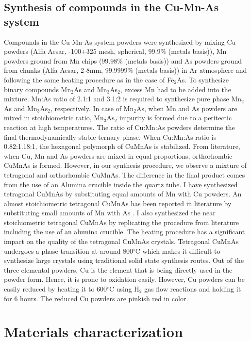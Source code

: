 \documentclass[10pt,doublespacing,edeposit]{uiucthesis2020}
\begin{document}
\begin{mainmatter}
\subsection{Synthesis of compounds in the Cu-Mn-As system}


Compounds in the Cu-Mn-As system powders were synthesized by mixing Cu powders (Alfa Aesar, -100+325 mesh, spherical, 99.9\% (metals basis)), Mn powders ground from Mn chips (99.98\% (metals basis)) and As powders ground from chunks (Alfa Aesar, 2-8mm, 99.9999\% (metals basis)) in Ar atmosphere and following the same heating procedure as in the case of Fe$_2$As. To synthesize binary compounds Mn$_2$As and Mn$_3$As$_2$, excess Mn had to be added into the mixture. Mn:As ratio of 2.1:1 and 3.1:2 is required to synthesize pure phase Mn$_2$As and Mn$_3$As$_2$, respectively. In case of Mn$_2$As, when Mn and As powders are mixed in stoichiometric ratio, Mn$_3$As$_2$ impurity is formed due to a peritectic reaction at high temperatures\cite{Yuzuri1960}. The ratio of Cu:Mn:As powders determine the final thermodynamically stable ternary phase. When Cu:Mn:As ratio is 0.82:1.18:1, the hexagonal polymorph of CuMnAs is stabilized. From literature, when Cu, Mn and As powders are mixed in equal proportions, orthorhombic CuMnAs is formed. However, in our synthesis procedure, we observe a mixture of tetragonal and orthorhombic CuMnAs. The difference in the final product comes from the use of an Alumina crucible inside the quartz tube. I have synthesized tetragonal CuMnAs by substituting equal amounts of Mn with Cu powders. An almost stoichiometric tetragonal CuMnAs has been reported in literature by substituting small amounts of Mn with As \cite{Uhlirova2019}. I also synthesized the near stoichiometric tetragonal CuMnAs by replicating the procedure from literature including the use of an alumina crucible. The heating procedure has a significant impact on the quality of the tetragonal CuMnAs crystals. Tetragonal CuMnAs undergoes a phase transition at around 800$^\circ$C which makes it difficult to synthesize large crystals using traditional solid state synthesis routes. Out of the three elemental powders, Cu is the element that is being directly used in the powder form. Hence, it is prone to oxidation easily. However, Cu powders can be easily reduced by heating it to 600$^\circ$C using H$_2$ gas flow reactions and holding it for 6 hours. The reduced Cu powders are pinkish red in color.

\section{Materials characterization}


\end{mainmatter}
\end{document}
